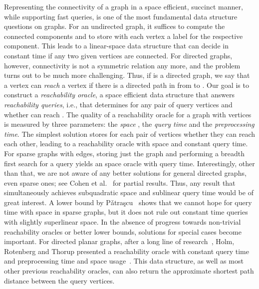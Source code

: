 \documentclass[11pt,a4paper]{paper}
\begin{document}
Representing the connectivity of a graph in a space efficient, 
succinct manner, while supporting fast queries, is
one of the most fundamental data structure questions on graphs.
For an undirected graph,
it suffices to compute the connected components and
to store with each vertex a label for the respective component.
This leads to a linear-space data
structure that can  decide in constant time if any two given vertices are
connected. For directed graphs, however, connectivity is not a 
symmetric relation any more,
and the problem turns out to be much more challenging.
Thus, if  is a directed graph, we say that a vertex  can 
\emph{reach} a vertex  if there is a directed path in 
from  to . Our goal is to construct a \emph{reachability oracle},
a space efficient data structure  that answers
\emph{reachability queries}, i.e., that determines for any pair of
query vertices  and  whether  can reach . The quality of a
reachability oracle for a graph with  vertices is measured by three
parameters: the \emph{space} , the \emph{query time}  and the
\emph{preprocessing time}.  The simplest solution stores for
each pair of vertices whether they can reach each other, leading to a
reachability oracle with  space and constant query time.
For sparse graphs with  edges, storing just the graph and 
performing a breadth first search for a query yields an  space 
oracle with  query time.
Interestingly, other than that, we are not aware of any better solutions
for general directed graphs,
even sparse ones; see Cohen et al.~\cite{CohenHaKaZw03} for 
partial results. Thus, any result that
simultaneously achieves subquadratic space and sublinear query time would be of
great interest. A lower bound by P\v{a}tra\c{s}cu~\cite{Patrascu11} shows
that we cannot hope for  query time with  space in sparse 
graphs,
but it does not rule out constant time queries with slightly superlinear space.
In the absence of progress towards
non-trivial reachability oracles or better lower bounds, solutions for special
cases become important.
For directed planar graphs, after a long line of 
research~\cite{ArikatiEtAl96,Frederickson87,Djidjev96,ChenXu00,Thorup04},
Holm, Rotenberg and Thorup presented a reachability oracle with 
constant query time and  preprocessing time and space 
usage~\cite{Holm2015}. This data structure, as well as most other 
previous  reachability oracles,  can also return the approximate 
shortest path distance between the query vertices.
\end{document}
